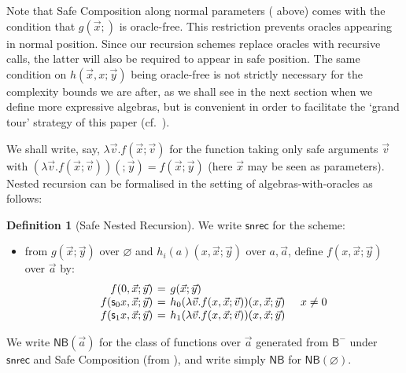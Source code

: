\documentclass[manuscript,screen]{acmart}
\renewcommand{\emptyset}{\varnothing}
\newcommand{\anupam}[1]{\todo{A: #1}}
\newcommand{\gianluca}[1]{\todo{G: #1}}
\theoremstyle{definition}
\newtheorem{defn}[thm]{Definition}
\theoremstyle{remark}
\newcommand{\sq}{\Box}
\renewcommand{\succ}[1]{\mathsf{s}_{#1}}
\newcommand{\cnd}{\mathsf{cond}}
\newcommand{\safenesrec}{\mathsf{snrec}}
\newcommand{\snrec}{\safenesrec}
\newcommand{\bc}{\mathsf{B}}
\newcommand{\bcnorec}{\bc^{-}}
\newcommand{\nested}{\mathsf{N}}
\newcommand{\nbc}{\nested\bc}
\newcommand{\cyclic}{\mathsf{C}}
\newcommand{\ncbc}{\cyclic\nested\bc}
\begin{document}
Note that Safe Composition along normal parameters ( above) comes with the condition that $g(\vec x; )$ is oracle-free. This restriction prevents oracles appearing in normal position. Since our recursion schemes replace oracles with recursive calls, the latter will also be required to appear in safe position. 
The same condition on $h(\vec x, x; \vec y)$ being oracle-free is not strictly necessary for the complexity bounds we are after, as we shall see in the next section when we define more expressive algebras, but is convenient in order to facilitate the `grand tour' strategy of this paper (cf.~).

We shall write, say, $\lambda \vec v .f(\vec x; \vec v)$ for the function taking only safe arguments $\vec v$ with $(\lambda \vec v .f(\vec x; \vec v))(;\vec y) = f(\vec x; \vec y)$ (here $\vec x$ may be seen as parameters).
Nested recursion can be formalised in the setting of algebras-with-oracles as follows:

\begin{defn}
[Safe Nested Recursion]
\label{defn:safe-nested-recursion}
We write $\snrec$ for the scheme:
\begin{itemize}
    \item from $g(\vec x; \vec y)$ over $\emptyset$ and $h_i(a)(x,\vec x;\vec y)$ over $a,\vec a$, define $f(x, \vec x;\vec y) $ over $\vec a$ by:
    \[
     \arraycolsep=2pt
    \begin{array}{rcll}
     f(0, \vec x; \vec y) &=&g(\vec x;\vec y)
    \\
        f(\succ 0 x, \vec x; \vec y) &=&h_0(\lambda \vec v . f(x,\vec x;\vec v))(x,\vec x;\vec y) &\quad  x \neq 0 \\
        f(\succ 1 x, \vec x; \vec y) &=&h_1(\lambda \vec v . f(x,\vec x;\vec v))(x,\vec x;\vec y)
    \end{array}
    \]
\end{itemize}
We write $\nbc(\vec a)$ for the class of functions over $\vec a$ generated from $\bcnorec$ under $\snrec$ and Safe Composition (from ), and write simply $\nbc$ for $\nbc(\emptyset)$.
\end{defn}
\end{document}
